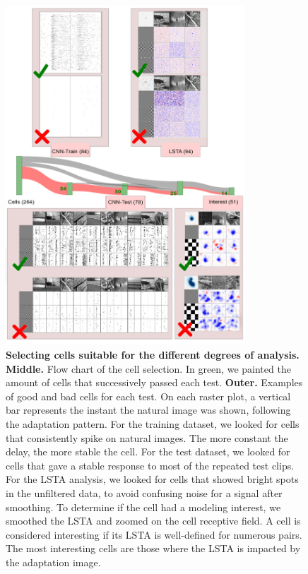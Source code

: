 \begin{figure}
    \centering
    \vspace*{-3cm}
    \includegraphics[width=0.8\textwidth]{pics/CellSelectionV2.png}
    \caption{\textbf{Selecting cells suitable for the different degrees
            of
            analysis.} \textbf{Middle.} Flow chart of the cell selection. In
        green, we painted the amount of cells that successively passed each
        test.
        \textbf{Outer.} Examples of good and
        bad cells
        for each test. On each raster plot, a vertical bar represents the
        instant the natural image was shown, following the adaptation pattern.
        For the
        training dataset, we looked for cells that
        consistently spike on natural images. The more constant the delay, the
        more
        stable the cell. For the test dataset, we looked for cells that gave a
        stable
        response to most of the repeated test clips. For the LSTA analysis, we
        looked
        for cells that showed bright spots in the unfiltered data, to avoid
        confusing
        noise for a signal after smoothing. To determine if the cell had a
        modeling
        interest, we smoothed the LSTA and zoomed on the cell receptive field.
        A cell
        is considered interesting if its LSTA is well-defined for numerous
        pairs. The
        most interesting cells are those where the LSTA is impacted by the
        adaptation
        image.}
    \label{fig:cell_selection}
\end{figure}

